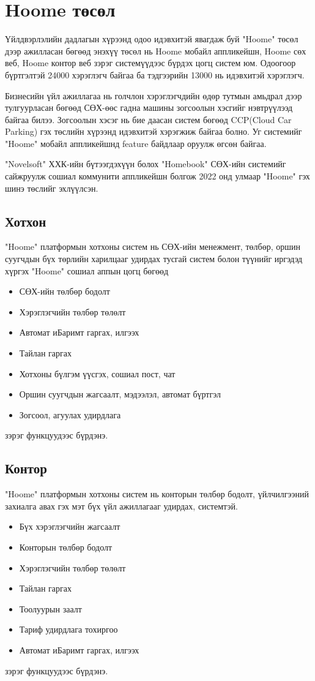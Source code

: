 \chapter{Hoome төсөл}

\hspace{0.5cm}
Үйлдвэрлэлийн дадлагын хүрээнд одоо идэвхитэй явагдаж буй "Hoome" төсөл дээр ажилласан бөгөөд энэхүү төсөл нь Hoome мобайл аппликейшн, Hoome сөх веб, Hoome контор веб зэрэг системүүдээс бүрдэх цогц систем юм. Одоогоор бүртгэлтэй 24000 хэрэглэгч байгаа ба тэдгээрийн 13000 нь идэвхитэй хэрэглэгч. 

Бизнесийн үйл ажиллагаа нь голчлон хэрэглэгчдийн өдөр тутмын амьдрал дээр тулгуурласан бөгөөд СӨХ-өөс гадна машины зогсоолын хэсгийг нэвтрүүлээд байгаа билээ. Зогсоолын хэсэг нь бие даасан систем бөгөөд CCP(Cloud Car Parking) гэх төслийн хүрээнд идэвхитэй хэрэгжиж байгаа болно. Уг системийг "Hoome" мобайл аппликейшнд feature байдлаар оруулж өгсөн байгаа. 

"Novelsoft" ХХК-ийн бүтээгдэхүүн болох "Homebook" СӨХ-ийн системийг сайжруулж сошиал коммунити аппликейшн болгож 2022 онд улмаар "Hoome" гэх шинэ төслийг эхлүүлсэн. 


\section{Хотхон}
"Hoome" платформын хотхоны систем нь СӨХ-ийн менежмент, төлбөр, оршин суугчдын бүх төрлийн харилцааг удирдах тусгай систем болон түүнийг иргэдэд хүргэх "Hoome" сошиал аппын цогц бөгөөд
\begin{itemize}
  \item СӨХ-ийн төлбөр бодолт
  \item Хэрэглэгчийн төлбөр төлөлт
  \item Автомат иБаримт гаргах, илгээх
  \item Тайлан гаргах
  \item Хотхоны бүлгэм үүсгэх, сошиал пост, чат
  \item Оршин суугчдын жагсаалт, мэдээлэл, автомат бүртгэл
  \item Зогсоол, агуулах удирдлага
\end{itemize}
зэрэг функцуудээс бүрдэнэ.

\section{Контор}
"Hoome" платформын хотхоны систем нь конторын төлбөр бодолт, үйлчилгээний захиалга авах гэх мэт бүх үйл ажиллагааг удирдах, системтэй.
\begin{itemize}
  \item Бүх хэрэглэгчийн жагсаалт
  \item Конторын төлбөр бодолт
  \item Хэрэглэгчийн төлбөр төлөлт
  \item Тайлан гаргах
  \item Тоолуурын заалт
  \item Тариф удирдлага тохиргоо
  \item Автомат иБаримт гаргах, илгээх
\end{itemize}
зэрэг функцуудээс бүрдэнэ.

